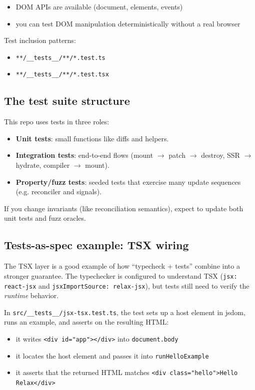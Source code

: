 \begin{itemize}
\item DOM APIs are available (document, elements, events)
\item you can test DOM manipulation deterministically without a real browser
\end{itemize}

Test inclusion patterns:

\begin{itemize}
\item \texttt{**/\_\_tests\_\_/**/*.test.ts}
\item \texttt{**/\_\_tests\_\_/**/*.test.tsx}
\end{itemize}

\subsection{The test suite structure}

This repo uses tests in three roles:

\begin{itemize}
\item \textbf{Unit tests}: small functions like diffs and helpers.
\item \textbf{Integration tests}: end-to-end flows (mount $\to$ patch $\to$ destroy, SSR $\to$ hydrate, compiler $\to$ mount).
\item \textbf{Property/fuzz tests}: seeded tests that exercise many update sequences (e.g. reconciler and signals).
\end{itemize}

If you change invariants (like reconciliation semantics), expect to update both unit tests and fuzz oracles.

\subsection{Tests-as-spec example: TSX wiring}

The TSX layer is a good example of how ``typecheck + tests'' combine into a stronger guarantee.
The typechecker is configured to understand TSX (\texttt{jsx: react-jsx} and \texttt{jsxImportSource: relax-jsx}), but tests still need to verify the \emph{runtime} behavior.

In \texttt{src/\_\_tests\_\_/jsx-tsx.test.ts}, the test sets up a host element in jsdom, runs an example, and asserts on the resulting HTML:

\begin{itemize}
\item it writes \texttt{<div id="app"></div>} into \texttt{document.body}
\item it locates the host element and passes it into \texttt{runHelloExample}
\item it asserts that the returned HTML matches \texttt{<div class="hello">Hello Relax</div>}
\end{itemize}

